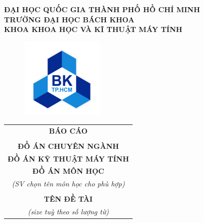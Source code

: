 \documentclass[a4paper]{article}
\theoremstyle{definition}
\begin{document}
\begin{titlepage}

\begin{center}
\LARGE \textbf{ĐẠI HỌC QUỐC GIA THÀNH PHỐ HỒ CHÍ MINH} \\
\vspace{0.2cm}
\LARGE \textbf{TRƯỜNG ĐẠI HỌC BÁCH KHOA} \\
\vspace{0.2cm}
\LARGE \textbf{KHOA KHOA HỌC VÀ KĨ THUẬT MÁY TÍNH}
\end{center}

\vspace{0.3cm}

\begin{figure}[h!]
\begin{center}
\includegraphics[width=4cm]{Images/hcmut.png}
\end{center}
\end{figure}

\begin{center}
\begin{tabular}{c}
\multicolumn{1}{c}{\textbf{{\LARGE BÁO CÁO}}}\\
\\{\textbf{{\LARGE ĐỒ ÁN CHUYÊN NGÀNH}}}
\\{\textbf{{\LARGE ĐỒ ÁN KỸ THUẬT MÁY TÍNH}}}
\\{\textbf{{\LARGE ĐỒ ÁN MÔN HỌC}}}
\\ \textit{(SV chọn tên môn học cho phù hợp)}
\\
\\
\textbf{\LARGE TÊN ĐỀ TÀI}
\\ \textit{(size tuỳ theo số lượng từ)}


\end{tabular}
\end{center}
\end{titlepage}
\end{document}
